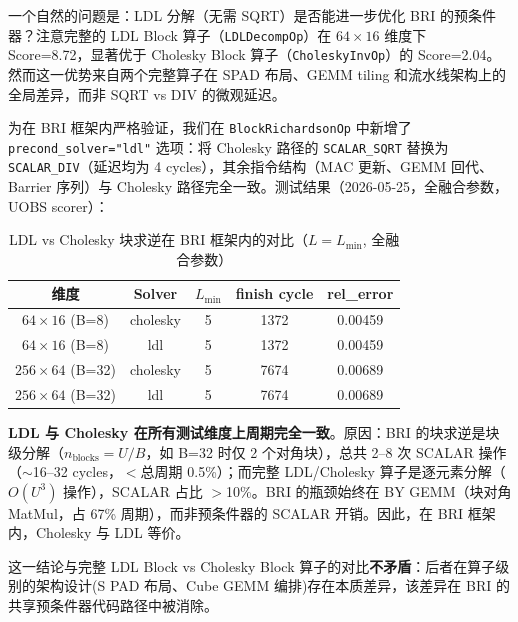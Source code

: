     一个自然的问题是：LDL 分解（无需 SQRT）是否能进一步优化 BRI 的预条件器？注意完整的
    LDL Block 算子（\texttt{LDLDecompOp}）在 $64\times16$ 维度下 Score=8.72，显著优于
    Cholesky Block 算子（\texttt{CholeskyInvOp}）的 Score=2.04。然而这一优势来自两个完整算子在
    SPAD 布局、GEMM tiling 和流水线架构上的全局差异，而非 SQRT vs DIV 的微观延迟。

    为在 BRI 框架内严格验证，我们在 \texttt{BlockRichardsonOp} 中新增了 \texttt{precond\_solver="ldl"}
    选项：将 Cholesky 路径的 \texttt{SCALAR\_SQRT} 替换为 \texttt{SCALAR\_DIV}（延迟均为
    4 cycles），其余指令结构（MAC 更新、GEMM 回代、Barrier 序列）与 Cholesky 路径完全一致。测试结果（2026-05-25，全融合参数，UOBS
    scorer）：

    \begin{table}[H]
        \centering
        \caption{LDL vs Cholesky 块求逆在 BRI 框架内的对比（$L=L_{\min}$,
        全融合参数）}
        \begin{tabular}{c c c c c}
            \toprule 维度                   & Solver   & $L_{\min}$ & finish cycle & rel\_error \\
            \midrule $64\times16$ (B=8)   & cholesky & 5          & 1372         & 0.00459    \\
            $64\times16$ (B=8)            & ldl      & 5          & 1372         & 0.00459    \\
            \midrule $256\times64$ (B=32) & cholesky & 5          & 7674         & 0.00689    \\
            $256\times64$ (B=32)          & ldl      & 5          & 7674         & 0.00689    \\
            \bottomrule
        \end{tabular}
    \end{table}

    \textbf{LDL 与 Cholesky 在所有测试维度上周期完全一致}。原因：BRI 的块求逆是块级分解（$n
    _{\text{blocks}}=U/B$，如 B=32 时仅 2 个对角块），总共 2--8 次 SCALAR 操作（$\sim$16--32
    cycles，$<$总周期 0.5\%）；而完整 LDL/Cholesky 算子是逐元素分解（$O(U^{3})$
    操作），SCALAR 占比 $>$10\%。BRI 的瓶颈始终在 BY GEMM（块对角 MatMul，占 67\%
    周期），而非预条件器的 SCALAR 开销。因此，在 BRI 框架内，Cholesky 与 LDL
    等价。

    这一结论与完整 LDL Block vs Cholesky Block 算子的对比\textbf{不矛盾}：后者在算子级别的架构设计(S
    PAD 布局、Cube GEMM 编排)存在本质差异，该差异在 BRI
    的共享预条件器代码路径中被消除。

